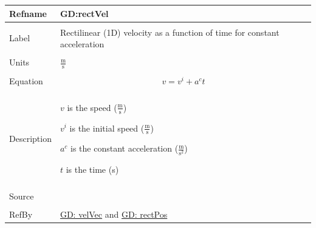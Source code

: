 \documentclass[12pt]{article}
\begin{document}
\noindent \begin{minipage}{\textwidth}
          \begin{tabular}{>{\raggedright}p{}>{\raggedright\arraybackslash}p{}}
          \toprule \textbf{Refname} & \textbf{GD:rectVel}
          \label{GD:rectVel}
          \\ \midrule \\
          Label & Rectilinear (1D) velocity as a function of time for constant acceleration
          \\ \midrule \\
          Units & $\frac{\text{m}}{\text{s}}$
          \\ \midrule \\
          Equation & \begin{displaymath}
                     v={v^{i}}+{a^{c}} t
                     \end{displaymath}
          \\ \midrule \\
          Description & \begin{symbDescription}
                        \item{$v$ is the speed ($\frac{\text{m}}{\text{s}}$)}
                        \item{${v^{i}}$ is the initial speed ($\frac{\text{m}}{\text{s}}$)}
                        \item{${a^{c}}$ is the constant acceleration ($\frac{\text{m}}{\text{s}^{2}}$)}
                        \item{$t$ is the time (s)}
                        \end{symbDescription}
          \\ \midrule \\
          Source & \cite[(pg. 8)]{hibbeler2004}
          \\ \midrule \\
          RefBy & \hyperref[GD:velVec]{GD: velVec} and \hyperref[GD:rectPos]{GD: rectPos}
          \\ \bottomrule
          \end{tabular}
          \end{minipage}
\end{document}
